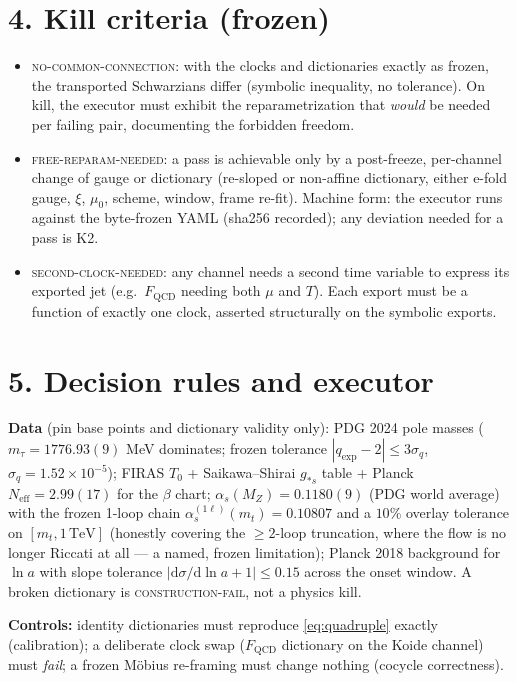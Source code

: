 \documentclass[10pt,a4paper]{article}
\newcommand{\FQ}{F_{\mathrm{QCD}}}
\begin{document}
\section*{4. Kill criteria (frozen)}

\begin{itemize}\itemsep2pt
\item[\textbf{K1}] \textsc{no-common-connection}: with the clocks and dictionaries exactly as frozen, the
transported Schwarzians differ (symbolic inequality, no tolerance). On kill, the executor must exhibit the
reparametrization that \emph{would} be needed per failing pair, documenting the forbidden freedom.
\item[\textbf{K2}] \textsc{free-reparam-needed}: a pass is achievable only by a post-freeze, per-channel
change of gauge or dictionary (re-sloped or non-affine dictionary, either e-fold gauge, $\xi$, $\mu_0$,
scheme, window, frame re-fit). Machine form: the executor runs against the byte-frozen YAML (sha256
recorded); any deviation needed for a pass is K2.
\item[\textbf{K3}] \textsc{second-clock-needed}: any channel needs a second time variable to express its
exported jet (e.g.\ $\FQ$ needing both $\mu$ and $T$). Each export must be a function of exactly one clock,
asserted structurally on the symbolic exports.
\end{itemize}

\section*{5. Decision rules and executor}

\textbf{Data} (pin base points and dictionary validity only): PDG 2024 pole masses
($m_\tau=1776.93(9)$ MeV dominates; frozen tolerance $|q_{\exp}-2|\le 3\sigma_q$, $\sigma_q=1.52\times10^{-5}$);
FIRAS $T_0$ + Saikawa--Shirai $g_{*s}$ table + Planck $N_{\mathrm{eff}}=2.99(17)$ for the $\beta$ chart;
$\alpha_s(M_Z)=0.1180(9)$ (PDG world average) with the frozen 1-loop chain
$\alpha_s^{(1\ell)}(m_t)=0.10807$ and a $10\%$ overlay tolerance on $[m_t,1\,\mathrm{TeV}]$ (honestly
covering the $\ge2$-loop truncation, where the flow is no longer Riccati at all --- a named, frozen
limitation); Planck 2018 background for $\ln a$ with slope tolerance
$|\mathrm{d}\sigma/\mathrm{d}\ln a+1|\le 0.15$ across the onset window. A broken dictionary is
\textsc{construction-fail}, not a physics kill.

\textbf{Controls:} identity dictionaries must reproduce \eqref{eq:quadruple} exactly (calibration);
a deliberate clock swap ($\FQ$ dictionary on the Koide channel) must \emph{fail}; a frozen M\"obius
re-framing must change nothing (cocycle correctness).
\end{document}
